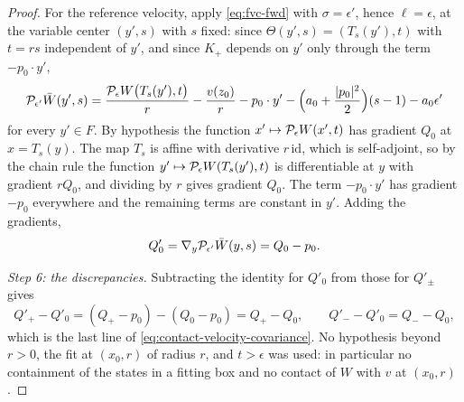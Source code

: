 \begin{proof}
For the reference velocity, apply \eqref{eq:fvc-fwd} with $\sigma=\epsilon'$,
hence $\ell=\epsilon$, at the variable center $(y',s)$ with $s$ fixed: since
$\Theta(y',s)=(T_s(y'),t)$ with $t=rs$ independent of $y'$, and since $K_+$
depends on $y'$ only through the term $-p_0\cdot y'$,
\[
  \mathcal{P}_{\epsilon'}\bar W(y',s)
   =\frac{\mathcal{P}_\epsilon W\bigl(T_s(y'),t\bigr)}{r}
     -\frac{v(z_0)}{r}-p_0\cdot y'
     -\Bigl(a_0+\frac{|p_0|^2}{2}\Bigr)(s-1)-a_0\epsilon'
\]
for every $y'\in F$. By hypothesis the function
$x'\mapsto\mathcal{P}_\epsilon W(x',t)$ has gradient $Q_0$ at $x=T_s(y)$. The map
$T_s$ is affine with derivative $r\,\mathrm{id}$, which is self-adjoint, so by
the chain rule the function $y'\mapsto\mathcal{P}_\epsilon W(T_s(y'),t)$ is
differentiable at $y$ with gradient $rQ_0$, and dividing by $r$ gives gradient
$Q_0$. The term $-p_0\cdot y'$ has gradient $-p_0$ everywhere and the remaining
terms are constant in $y'$. Adding the gradients,
\[
  Q'_0=\nabla_y\mathcal{P}_{\epsilon'}\bar W(y,s)=Q_0-p_0 .
\]

\emph{Step 6: the discrepancies.}
Subtracting the identity for $Q'_0$ from those for $Q'_\pm$ gives
\[
  Q'_+-Q'_0=(Q_+-p_0)-(Q_0-p_0)=Q_+-Q_0,\qquad
  Q'_--Q'_0=Q_--Q_0 ,
\]
which is the last line of \eqref{eq:contact-velocity-covariance}. No hypothesis
beyond $r>0$, the fit at $(x_0,r)$ of radius $r$, and $t>\epsilon$ was used: in
particular no containment of the states in a fitting box and no contact of $W$
with $v$ at $(x_0,r)$.
\end{proof}
